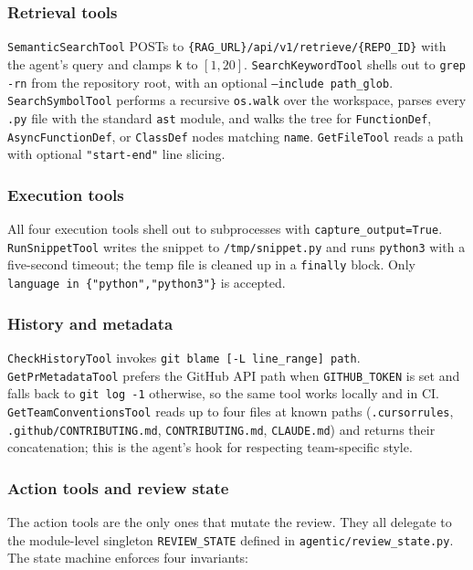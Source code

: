 \documentclass[11pt,a4paper]{article}
\newcommand{\code}[1]{\texttt{\small #1}}
\begin{document}
\subsubsection{Retrieval tools}

\code{SemanticSearchTool} POSTs to
\code{\{RAG\_URL\}/api/v1/retrieve/\{REPO\_ID\}} with the agent's query and
clamps \code{k} to $[1,20]$. \code{SearchKeywordTool} shells out to
\code{grep -rn} from the repository root, with an optional
\code{--include path\_glob}. \code{SearchSymbolTool} performs a recursive
\code{os.walk} over the workspace, parses every \code{.py} file with the
standard \code{ast} module, and walks the tree for
\code{FunctionDef}, \code{AsyncFunctionDef}, or \code{ClassDef} nodes
matching \code{name}. \code{GetFileTool} reads a path with optional
\code{"start-end"} line slicing.

\subsubsection{Execution tools}

All four execution tools shell out to subprocesses with
\code{capture\_output=True}. \code{RunSnippetTool} writes the snippet to
\code{/tmp/snippet.py} and runs \code{python3} with a five-second timeout;
the temp file is cleaned up in a \code{finally} block. Only
\code{language in \{"python","python3"\}} is accepted.

\subsubsection{History and metadata}

\code{CheckHistoryTool} invokes \code{git blame [-L line\_range] path}.
\code{GetPrMetadataTool} prefers the GitHub API path when
\code{GITHUB\_TOKEN} is set and falls back to \code{git log -1} otherwise,
so the same tool works locally and in CI. \code{GetTeamConventionsTool}
reads up to four files at known paths (\code{.cursorrules},
\code{.github/CONTRIBUTING.md}, \code{CONTRIBUTING.md}, \code{CLAUDE.md})
and returns their concatenation; this is the agent's hook for
respecting team-specific style.

\subsubsection{Action tools and review state}
\label{sec:review-state}

The action tools are the only ones that mutate the review. They all
delegate to the module-level singleton \code{REVIEW\_STATE} defined in
\code{agentic/review\_state.py}. The state machine enforces four
invariants:
\end{document}
